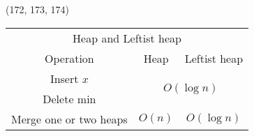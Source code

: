 \begin{theorem}{(172, 173, 174)}
\begin{itemize}
\begin{algorithm}[H]
\begin{algorithmic}[1]
                    \State {}
                \EndFunction
            \end{algorithmic}
        \end{algorithm}
        \begin{table}[H]
            \centering
            \begin{tabular}{|c|c|c|}
                \hline
                \multicolumn{3}{|c|}{Heap and Leftist heap} \\
                \Xhline{3\arrayrulewidth}
                Operation & Heap & Leftist heap \\
                \Xhline{2\arrayrulewidth}
                Insert $x$ & \multicolumn{2}{c|}{\multirow{2}{*}{$O(\log n)$}} \\
                \cline{1-1}
                Delete min & \multicolumn{2}{c|}{} \\
                \hline
                Merge one or two heaps & $O(n)$ & $O(\log n)$ \\
                \hline
            \end{tabular}
        \end{table}
    \end{itemize}
\end{theorem}

